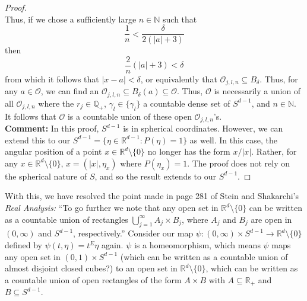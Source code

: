 \documentclass{article}
\theoremstyle{theorem}
\theoremstyle{remark}
\begin{document}
\begin{proof}
\begin{equation*}
\end{equation*}
Thus, if we chose a sufficiently large $n\in \mathbb{N}$ such that
\begin{equation*}
    \frac{1}{n} < \frac{\delta}{2(\vert a \vert + 3)}
\end{equation*}
then 
\begin{equation*}
    \frac{2}{n}\left( \vert a \vert + 3 \right) < \delta
\end{equation*}
from which it follows that $\vert x - a\vert < \delta$, or equivalently that $\mathcal{O}_{j,l,n} \subseteq B_\delta$. Thus, for any $a\in \mathcal{O}$, we can find an $\mathcal{O}_{j,l,n} \subseteq B_\delta(a) \subseteq \mathcal{O}$. Thus, $\mathcal{O}$ is necessarily a union of all $\mathcal{O}_{j,l,n}$ where the $r_j \in \mathbb{Q}_+$, $\gamma_l \in \{ \gamma_l \}$ a countable dense set of $S^{d-1}$, and $n\in \mathbb{N}$. It follows that $\mathcal{O}$ is a countable union of these open $\mathcal{O}_{j,l,n}$'s. \\

\noindent \textbf{Comment:} In this proof, $S^{d-1}$ is in spherical coordinates. However, we can extend this to our $S^{d-1} = \{ \eta \in \mathbb{R}^{d-1}: P(\eta) = 1\}$ as well. In this case, the angular position of a point $x \in \mathbb{R}^d\setminus \{ 0\}$ no longer has the form $x/\vert x \vert$. Rather, for any $x \in \mathbb{R}^d\setminus \{ 0 \}$,  $ x = (\vert x \vert , \eta_x)$ where $P(\eta_x) = 1$. The proof does not rely on the spherical nature of $S$, and so the result extends to our $S^{d-1}$. 

\end{proof}



With this, we have resolved the point made in page 281 of Stein  and Shakarchi's \textit{Real Analysis:} ``To go further we note that any open set in $\mathbb{R}^d\setminus \{ 0 \}$ can be written as a countable union of rectangles $\bigcup^\infty_{j=1} A_j \times B_j$, where $A_j$ and $B_j$ are open in $(0,\infty)$ and $S^{d-1}$, respectively.'' Consider our map $\psi: (0,\infty)\times S^{d-1} \to \mathbb{R}^d\setminus \{ 0 \}$ defined by $\psi(t,\eta) = t^E \eta$ again. $\psi$ is a homeomorphism, which means $\psi$ maps any open set in $(0,1)\times S^{d-1}$ (which can be written as a countable union of almost disjoint closed cubes?) to an open set in $\mathbb{R}^d\setminus \{ 0\}$, which can be written as a countable union of open rectangles of the form $A \times B$ with $A \subseteq \mathbb{R}_+$ and $B\subseteq S^{d-1}$. 
\end{document}

